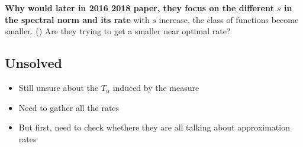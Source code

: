 \textbf{Why would later in 2016 2018 paper, they focus on the different $s$ in the spectral norm and its rate}
with $s$ increase, the class of functions become smaller. () 
Are they trying to get a smaller near optimal rate?

\subsection{Unsolved}

\begin{itemize}
    \item Still unsure about the $T_{\alpha}$ induced by the measure
    \item Need to gather all the rates
    \item But first, need to check whethere they are all talking about approximation rates
\end{itemize}

